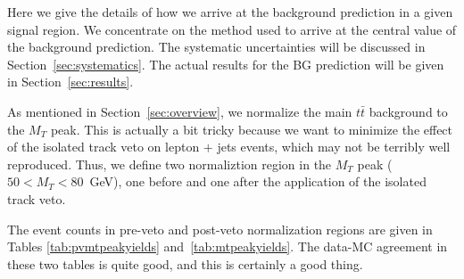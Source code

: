 

Here we give the details of how we arrive at the background prediction
in a given signal region.  We concentrate on the method used
to arrive at the central value of the background prediction.  The
systematic
uncertainties will be discussed in Section~\ref{sec:systematics}.
The actual results for the BG prediction will be given in Section~\ref{sec:results}.

As mentioned in Section~\ref{sec:overview}, we normalize the main
$t\bar{t}$
background to the $M_T$ peak.  This is actually a bit tricky because 
we want to minimize the effect of the isolated track veto on 
lepton $+$ jets events, which may not be terribly well reproduced.
Thus, we define two normaliztion region in the $M_T$ peak ($50 < M_T < 80$~GeV),
one before and one after the application of the isolated track veto.

The event counts in pre-veto and post-veto normalization regions
are given in Tables \ref{tab:pvmtpeakyields} and~\ref{tab:mtpeakyields}.
The data-MC agreement in these two tables is quite good, and this is 
certainly a good thing.




